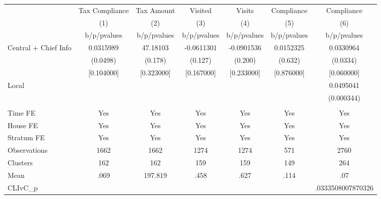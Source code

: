 {
\def\sym#1{\ifmmode^{#1}\else\(^{#1}\)\fi}
\begin{tabular}{l*{6}{c}}
\toprule
                &\multicolumn{1}{c}{Tax Compliance}&\multicolumn{1}{c}{Tax Amount}&\multicolumn{1}{c}{Visited}&\multicolumn{1}{c}{Visits}&\multicolumn{1}{c}{Compliance}&\multicolumn{1}{c}{Compliance}\\
                &\multicolumn{1}{c}{(1)}&\multicolumn{1}{c}{(2)}&\multicolumn{1}{c}{(3)}&\multicolumn{1}{c}{(4)}&\multicolumn{1}{c}{(5)}&\multicolumn{1}{c}{(6)}\\
                &b/p/pvalues&b/p/pvalues&b/p/pvalues&b/p/pvalues&b/p/pvalues&b/p/pvalues\\
\midrule
Central + Chief Info&0.0315989& 47.18103&-0.0611301&-0.0901536&0.0152325&0.0330964\\
                & (0.0498)&  (0.178)&  (0.127)&  (0.200)&  (0.632)& (0.0334)\\
                &[0.104000]&[0.323000]&[0.167000]&[0.233000]&[0.876000]&[0.060000]\\
Local           &         &         &         &         &         &0.0495041\\
                &         &         &         &         &         &(0.000344)\\
                &         &         &         &         &         &         \\
Time FE         &      Yes&      Yes&      Yes&      Yes&      Yes&      Yes\\
House FE        &      Yes&      Yes&      Yes&      Yes&      Yes&      Yes\\
Stratum FE      &      Yes&      Yes&      Yes&      Yes&      Yes&      Yes\\
\midrule
Observations    &     1662&     1662&     1274&     1274&      571&     2760\\
Clusters        &      162&      162&      159&      159&      149&      264\\
Mean            &     .069&  197.819&     .458&     .627&     .114&      .07\\
CLIvC\_p         &         &         &         &         &         &.0333508007870326\\
\bottomrule
\end{tabular}
}
